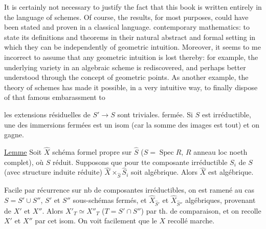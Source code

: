 It is certainly not necessary to justify the fact that this book is written entirely in the language of schemes. Of course, the results, for most purposes, could have been stated and proven in a classical language.
contemporary mathematics: to state its definitions and theorems in their natural abstract and formal setting in which they can be   independently of geometric intuition. Moreover, it seems to me incorrect to assume that any geometric intuition is lost thereby: for example, the underlying variety in an algebraic scheme is rediscovered, and perhaps better understood through the concept of geometric points. As another example, the theory of schemes has made it possible, in a very intuitive way, to finally dispose of that famous embarassment to


les extensions résiduelles de $S'\longrightarrow S$ sont triviales.    fermée. Si $S$ est irréductible, une des immersions fermées  est un isom (car la somme des images est tout) et on gagne.  


\uline{Lemme} Soit $\widehat X$ schéma formel propre sur $\widehat S$ ($S=\operatorname{Spec}R$, $R$ anneau loc noeth complet), où $S$ réduit. Supposons que pour tte composante irréductible $S_i$ de $S$ (avec structure induite réduite) $\widehat X\times_{\widehat S}\widehat S_i$ soit algébrique. Alors $\widehat X$ est algébrique.

Facile par récurrence sur nb de composantes irréductibles, on est ramené au cas $S=S'\cup S''$, $S'$ et $S''$ sous-schémas fermés, et $\widehat X_{\widehat S'}$ et $\widehat X_{\widehat S''}$  algébriques, provenant de $X'$ et $X''$. Alors $X'_T\simeq X''_T$ ($T=S'\cap S''$) par th. de comparaison, et on recolle $X'$ et $X''$ par cet isom. On voit facilement que le $X$ recollé marche.

